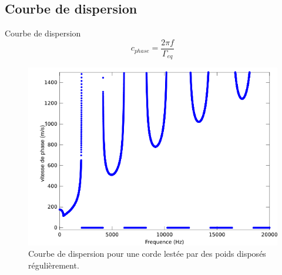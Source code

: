 \documentclass[xcolor=x11names,compress]{beamer}
\renewcommand{\(}{\begin{columns}}
\renewcommand{\)}{\end{columns}}
\newcommand{\<}[1]{\begin{column}{#1}}
\renewcommand{\>}{\end{column}}
\begin{document}
\subsection{Courbe de dispersion}
\begin{frame}{Courbe de dispersion}
\begin{equation}\label{eq3}
c_{phase} = \frac{2\pi f}{\Gamma_{eq}}
\end{equation}

\begin{figure}[!h]\centering
\includegraphics[scale = 0.4]{./figures/courbe_dispersion2.png}
\caption*{\scriptsize Courbe de dispersion pour une corde lestée par des poids disposés régulièrement.}
\end{figure}
\end{frame} 
\end{document}
